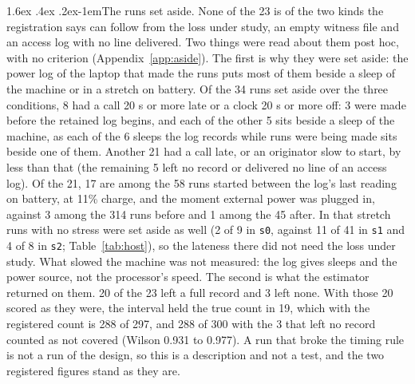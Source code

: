\documentclass[11pt]{article}
\makeatletter
\renewcommand\paragraph{\@startsection{paragraph}{4}{\z@}%
  {1.6ex \@plus .4ex \@minus .2ex}{-1em}{\normalfont\normalsize\bfseries}}
\makeatother
\begin{document}
\paragraph{The runs set aside.} None of the 23 is of the two kinds the registration says
can follow from the loss under study, an empty witness file and an access log with no
line delivered. Two things were read about them post hoc, with no criterion
(Appendix~\ref{app:aside}). The first is why they were set aside: the power log of
the laptop that made the runs puts most of them beside a sleep of the machine or in a
stretch on battery. Of the 34 runs set aside over the
three conditions, 8 had a call 20 s or more late or a clock 20 s or more off: 3 were
made before the retained log begins, and each of the other 5 sits beside a sleep of the
machine, as each of the 6 sleeps the log records while runs were being made sits beside
one of them. Another 21 had a call late, or an originator slow to start, by less than that (the
remaining 5 left no record or delivered no line of an access log). Of the 21, 17 are among the 58 runs started
between the log's last reading on battery, at 11\% charge, and the moment external power
was plugged in, against 3 among the 314 runs before and 1 among the 45 after. In that
stretch runs with no stress were set aside as well (2 of 9 in \texttt{s0}, against 11 of
41 in \texttt{s1} and 4 of 8 in \texttt{s2}; Table~\ref{tab:host}), so the lateness there
did not need the loss under study. What slowed the machine was not measured: the log
gives sleeps and the power source, not the processor's speed. The second is what the estimator returned on them. 20 of the 23 left a
full record and 3 left none. With those 20 scored as they were, the interval held the
true count in 19, which with the registered count is 288 of 297, and 288 of 300 with the
3 that left no record counted as not covered (Wilson 0.931 to 0.977). A run that broke
the timing rule is not a run of the design, so this is a description and not a test, and
the two registered figures stand as they are.
\end{document}
